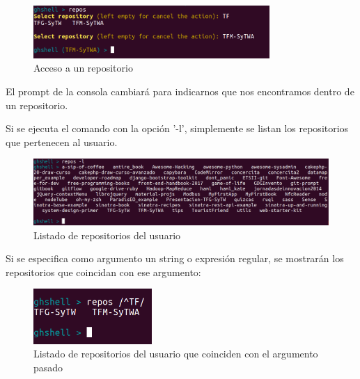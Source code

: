 \begin{itemize}
		\begin{figure}[H]
		\begin{center}
		\includegraphics[width=0.8\textwidth]{images/repos1-1}
		\caption{Acceso a un repositorio}
		\label{fig:repos1-1}
		\end{center}
		\end{figure}
		
		
		El prompt de la consola cambiará para indicarnos que nos encontramos dentro de un repositorio.		
		\bigskip
		
		Si se ejecuta el comando con la opción '-l', simplemente se listan los repositorios que pertenecen al usuario.
		
		\begin{figure}[H]
		\begin{center}
		\includegraphics[width=1\textwidth]{images/repos1-2}
		\caption{Listado de repositorios del usuario}
		\label{fig:repos1-2}
		\end{center}
		\end{figure}
		
		Si se especifica como argumento un string o expresión regular, se mostrarán los repositorios que coincidan con ese argumento:
		
		\begin{figure}[H]
		\begin{center}
		\includegraphics[width=0.4\textwidth]{images/repos1-3}
		\caption{Listado de repositorios del usuario que coinciden con el argumento pasado}
		\label{fig:repos1-3}
		\end{center}
		\end{figure}
		

\end{itemize}
